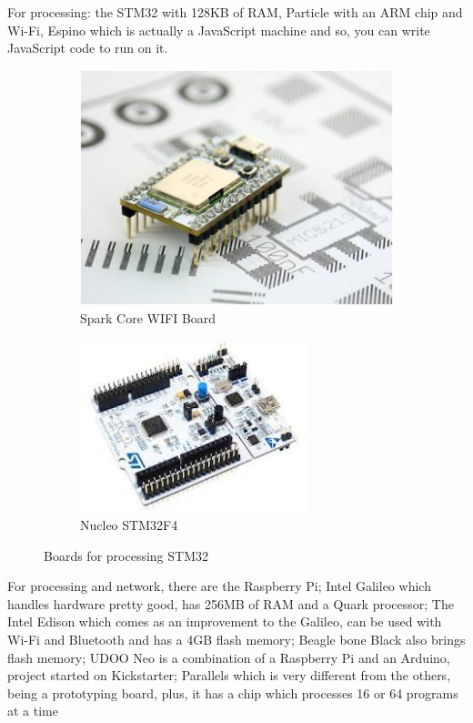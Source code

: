 For processing: the STM32 with 128KB of RAM, Particle with an ARM chip and Wi-Fi, Espino which is actually a JavaScript machine and so, you can write JavaScript code to run on it.

\begin{figure}[ht]

\begin{subfigure}{0.4\textwidth}
    \includegraphics[width=0.9\linewidth]{figures/Spark Core WIFI Board.jpg}
    \caption{Spark Core WIFI Board}
\end{subfigure}
\begin{subfigure}{0.5\textwidth}
    \includegraphics[width=0.9\linewidth, height=5cm]{figures/Nucleo STM32F4.jpg}
    \caption{Nucleo STM32F4}
\end{subfigure}

\caption{Boards for processing STM32}
\end{figure}


For processing and network, there are the Raspberry Pi; Intel Galileo which handles hardware pretty good, has 256MB of RAM and a Quark processor; The Intel Edison which comes as an improvement to the Galileo, can be used with Wi-Fi and Bluetooth and has a 4GB flash memory; Beagle bone Black also brings flash memory; UDOO Neo is a combination of a Raspberry Pi and an Arduino, project started on Kickstarter; Parallels which is very different from the others, being a prototyping board, plus, it has a chip which processes 16 or 64 programs at a time 

